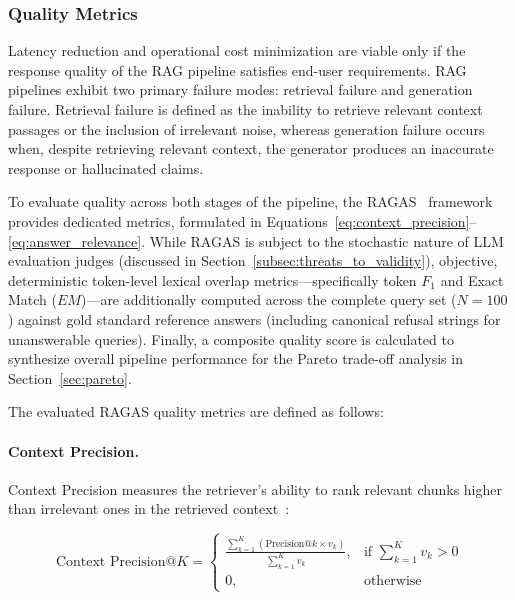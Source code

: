 \subsubsection{Quality Metrics}
\label{sec:quality}

Latency reduction and operational cost minimization are viable only if the response quality of the RAG pipeline satisfies end-user requirements. RAG pipelines exhibit two primary failure modes: retrieval failure and generation failure. Retrieval failure is defined as the inability to retrieve relevant context passages or the inclusion of irrelevant noise, whereas generation failure occurs when, despite retrieving relevant context, the generator produces an inaccurate response or hallucinated claims. 

To evaluate quality across both stages of the pipeline, the RAGAS~\citep{es2024ragas} framework provides dedicated metrics, formulated in Equations~\ref{eq:context_precision}--\ref{eq:answer_relevance}. While RAGAS is subject to the stochastic nature of LLM evaluation judges (discussed in Section~\ref{subsec:threats_to_validity}), objective, deterministic token-level lexical overlap metrics---specifically token $F_1$ and Exact Match ($EM$)---are additionally computed across the complete query set ($N = 100$) against gold standard reference answers (including canonical refusal strings for unanswerable queries). Finally, a composite quality score is calculated to synthesize overall pipeline performance for the Pareto trade-off analysis in Section~\ref{sec:pareto}.

The evaluated RAGAS quality metrics are defined as follows:

\paragraph{Context Precision.} Context Precision measures the retriever's ability to rank relevant chunks higher than irrelevant ones in the retrieved context~\citep{es2024ragas}:

\begin{equation}
\label{eq:context_precision}
\text{Context Precision}@K = \begin{cases}
\frac{\sum_{k=1}^{K} \left( \text{Precision}@k \times v_k \right)}{\sum_{k=1}^{K} v_k}, & \text{if } \sum_{k=1}^{K} v_k > 0 \\
0, & \text{otherwise}
\end{cases}
\end{equation}

